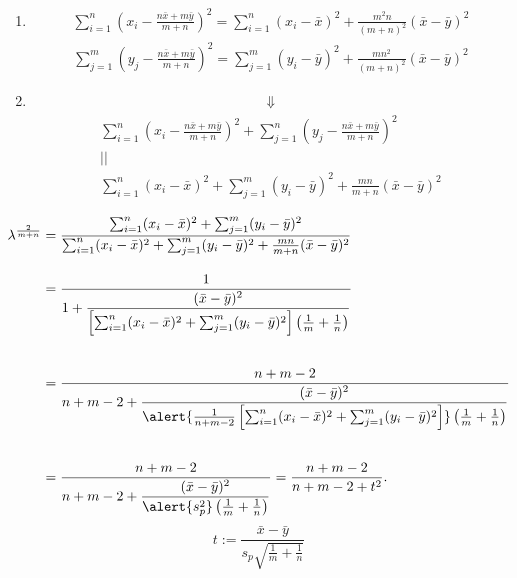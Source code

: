 \begin{frame}
\begin{enumerate}
	\item []
		\begin{align*}
		\sum_{i=1}^n \left(x_i- \frac{n\bar{x}+m\bar{y}}{m+n}\right)^2 = \sum_{i=1}^n (x_i-\bar{x})^2 +  \frac{m^2n}{(m+n)^2} (\bar{x}-\bar{y})^2
		\end{align*}
		\vfill
		\begin{align*}
		\sum_{j=1}^m \left(y_j- \frac{n\bar{x}+m\bar{y}}{m+n}\right)^2 = \sum_{j=1}^m (y_i-\bar{y})^2 +  \frac{mn^2}{(m+n)^2} (\bar{x}-\bar{y})^2
	\end{align*}
		\vfill
	\item[]
		\begin{align*}
			\Downarrow
		\end{align*}
		\begin{gather*}
			\sum_{i=1}^n \left(x_i- \frac{n\bar{x}+m\bar{y}}{m+n}\right)^2+ \sum_{j=1}^n \left(y_j-\frac{n\bar{x}+m\bar{y}}{m+n}\right)^2 \\
				 || \\
			\sum_{i=1}^n (x_i-\bar{x})^2 + \sum_{j=1}^m (y_i-\bar{y})^2+  \frac{mn}{m+n} (\bar{x}-\bar{y})^2
		\end{gather*}
\end{enumerate}
\end{frame}
\begin{frame}
	\begin{align*}
		\lambda^{ \frac{2}{m+n}} &=
		\frac{\sum_{i=1}^n (x_i-\bar{x})^2 + \sum_{j=1}^m (y_i-\bar{y})^2}{\sum_{i=1}^n (x_i-\bar{x})^2 + \sum_{j=1}^m (y_i-\bar{y})^2+  \frac{mn}{m+n}(\bar{x}-\bar{y})^2}\\[1em]
& =  \frac{1}{\displaystyle 1+  \frac{(\bar{x}-\bar{y})^2}{  \left[ \sum_{i=1}^n (x_i-\bar{x})^2 + \sum_{j=1}^m (y_i-\bar{y})^2 \right] \left( \frac{1}{m} + \frac{1}{n}  \right)}}
		\\[2em]& =  \frac{n+m-2}{\displaystyle n+m-2+  \frac{(\bar{x}-\bar{y})^2}{ \alert{ \frac{1}{n+m-2} \left[ \sum_{i=1}^n (x_i-\bar{x})^2 + \sum_{j=1}^m (y_i-\bar{y})^2 \right]} \left( \frac{1}{m} + \frac{1}{n}  \right)}}
		\\[2em] &=
		\frac{n+m-2}{\displaystyle n+m-2 +  \frac{(\bar{x}-\bar{y})^2}{\alert{s_p^2}\left(  \frac{1}{m}+  \frac{1}{n}\right)}}
		 =
		\frac{n+m-2}{n+m-2+t^2}.
	\end{align*}
	\vfill	\[
	\boxed{t :=  \frac{\bar{x}-\bar{y}}{s_p\sqrt{  \frac{1}{m}+  \frac{1}{n}} }}
	\]
\end{frame}
